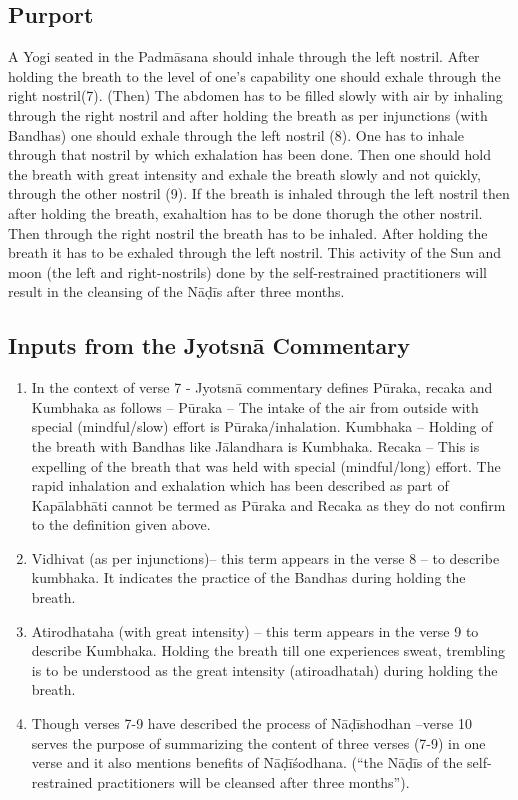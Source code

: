 \subsection*{Purport}


A Yogi seated in the Padmāsana should inhale through the left nostril. After holding the breath to the level of one’s capability one should exhale through the right nostril(7). (Then) The abdomen has to be filled slowly with air by inhaling through the right nostril and after holding the breath as per injunctions (with Bandhas) one should exhale through the left nostril (8). One has to inhale through that nostril by which exhalation has been done. Then one should hold the breath with great intensity and exhale the breath slowly and not quickly, through the other nostril (9).  If the breath is inhaled through the left nostril then after holding the breath, exahaltion has to be done thorugh the other nostril. Then through the right nostril the breath has to be inhaled. After holding the breath it has to be exhaled through the left nostril. This activity of the Sun and moon (the left and right-nostrils) done by the self-restrained practitioners will result in the cleansing of the Nāḍīs after three months. 

\subsection*{Inputs from the Jyotsnā Commentary}


\begin{enumerate}
\item In the context of verse 7 - Jyotsnā commentary defines Pūraka, recaka and Kumbhaka as follows – Pūraka – The intake of the air from outside with special (mindful/slow) effort  is Pūraka/inhalation. Kumbhaka – Holding of the breath with Bandhas like Jālandhara is Kumbhaka. Recaka – This is expelling of the breath that was held with special (mindful/long) effort. The rapid inhalation and exhalation which has been described as part of Kapālabhāti cannot be termed as Pūraka and Recaka as they do not confirm to the definition given above. 
\item Vidhivat (as per injunctions)– this term appears in the verse 8 – to describe kumbhaka. It indicates the practice of the Bandhas during holding the breath. 
\item Atirodhataha (with great intensity) – this term appears in the verse 9 to describe Kumbhaka. Holding the breath till one experiences sweat, trembling is to be understood as the great intensity (atiroadhatah) during holding the breath.
\item Though verses 7-9 have described the process of Nāḍīshodhan –verse 10 serves the purpose of summarizing the content of three verses (7-9) in one verse and it also mentions benefits of Nāḍīśodhana. (“the Nāḍīs of the self-restrained practitioners will be cleansed after three months”). 
\end{enumerate}

